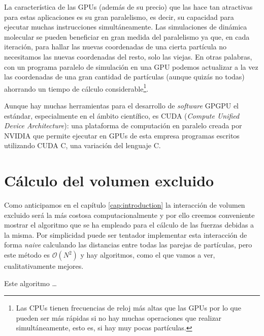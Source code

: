 La característica de las GPUs (además de su precio) que las hace tan atractivas para estas aplicaciones es su gran paralelismo, es decir, su capacidad para ejecutar muchas instrucciones simultáneamente. Las simulaciones de dinámica molecular se pueden beneficiar en gran medida del paralelismo ya que, en cada iteración, para hallar las nuevas coordenadas de una cierta partícula no necesitamos las nuevas coordenadas del resto, solo las viejas. En otras palabras, con un programa paralelo de simulación en una GPU podemos actualizar a la vez las coordenadas de una gran cantidad de partículas (aunque quizás no todas) ahorrando un tiempo de cálculo considerable\footnote{Las CPUs tienen frecuencias de reloj más altas que las GPUs por lo que pueden ser más rápidas si no hay muchas operaciones que realizar simultáneamente, esto es, si hay muy pocas partículas.}.

Aunque hay muchas herramientas para el desarrollo de \textit{software} GPGPU el estándar, especialmente en el ámbito científico, es CUDA \cite{Wilt2013} (\textit{Compute Unified Device Architecture}): una plataforma de computación en paralelo creada por NVIDIA que permite ejecutar en GPUs de esta empresa programas escritos utilizando CUDA C, una variación del lenguaje C.

\section{Cálculo del volumen excluido}

Como anticipamos en el capítulo \ref{cap:introduction} la interacción de volumen excluido será la más costosa computacionalmente y por ello creemos conveniente mostrar el algoritmo que se ha empleado para el cálculo de las fuerzas debidas a la misma. Por simplicidad puede ser tentador implementar esta interacción de forma \textit{naive} calculando las distancias entre todas las parejas de partículas, pero este método es $\mathcal{O}(N^2)$ y hay algoritmos, como el que vamos a ver, cualitativamente mejores.

Este algoritmo \cite{Green2010} \dots

